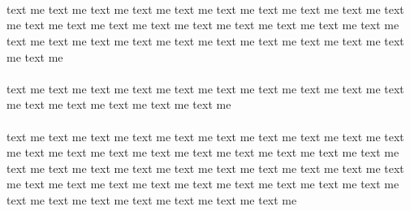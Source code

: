 \documentclass[3pt,a4paper,showtrims]{article}%
\begin{document}
%
\pagestyle{fancy}%
\renewcommand{\headrulewidth}{0pt}%
\renewcommand{\footrulewidth}{0pt}%

\\%
\\%
\\%
text me text me text me text me text me text me text me text me text me text me text me text me text me text me text me 
text me text me text me text me text me text me text me text me text me text me text me text me text me text me text me 
\\
\\
text me text me text me text me text me text me text me text me text me text me text me text me text me text me text me 
\\
\\
text me text me text me text me text me text me text me text me text me text me text me text me text me text me text me 
text me text me text me text me text me text me text me text me text me text me text me text me text me text me text me 
text me text me text me text me text me text me text me text me text me text me text me text me text me text me text me 








%
\end{document}

